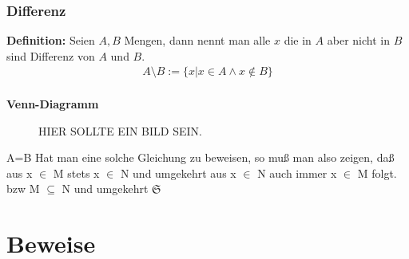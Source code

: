 \documentclass[../AbiMappe_Mathe.tex]{subfiles}
\begin{document}
\subsubsection{Differenz}
\textbf{Definition:} Seien $A,B$ Mengen, dann nennt man alle $x$ die in $A$ aber nicht in $B$ sind Differenz von $A$ und $B$.
\begin{align*}
A \setminus B:=\{x|x \in A \land x \notin B\}
\end{align*}
\\
\textbf{Venn-Diagramm}
\begin{figure}[H]
\centering
HIER SOLLTE EIN BILD SEIN.
\end{figure}

A=B
Hat man eine solche Gleichung zu beweisen, so muß man also zeigen, daß aus x $\in$ M stets x $\in$ N und umgekehrt aus x $\in$ N auch immer x $\in$ M folgt. bzw M $\subseteq$ N und umgekehrt
 $\mathfrak{S}$

 \section{Beweise}
\end{document}
